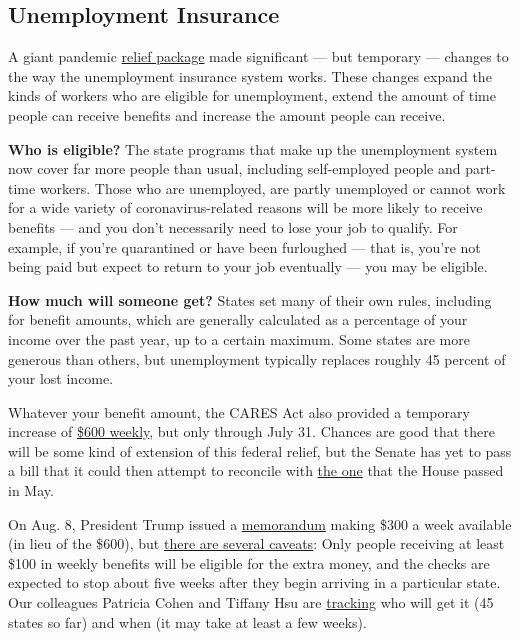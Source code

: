 \hypertarget{unemployment-insurance}{%
\subsection{Unemployment Insurance}\label{unemployment-insurance}}

A giant pandemic
\href{https://www.nytimes3xbfgragh.onion/2020/03/27/world/coronavirus-live-news-updates.html\#link-1900f91a}{relief
package} made significant --- but temporary --- changes to the way the
unemployment insurance system works. These changes expand the kinds of
workers who are eligible for unemployment, extend the amount of time
people can receive benefits and increase the amount people can receive.

\textbf{Who is eligible?} The state programs that make up the
unemployment system now cover far more people than usual, including
self-employed people and part-time workers. Those who are unemployed,
are partly unemployed or cannot work for a wide variety of
coronavirus-related reasons will be more likely to receive benefits ---
and you don't necessarily need to lose your job to qualify. For example,
if you're quarantined or have been furloughed --- that is, you're not
being paid but expect to return to your job eventually --- you may be
eligible.

\textbf{How much will someone get?} States set many of their own rules,
including for benefit amounts, which are generally calculated as a
percentage of your income over the past year, up to a certain maximum.
Some states are more generous than others, but unemployment typically
replaces roughly 45 percent of your lost income.

Whatever your benefit amount, the CARES Act also provided a temporary
increase of
\href{https://www.nytimes3xbfgragh.onion/interactive/2020/04/23/business/economy/unemployment-benefits-stimulus-coronavirus.html}{\$600
weekly}, but only through July 31. Chances are good that there will be
some kind of extension of this federal relief, but the Senate has yet to
pass a bill that it could then attempt to reconcile with
\href{https://www.nytimes3xbfgragh.onion/2020/05/15/us/politics/house-simulus-vote.html}{the
one} that the House passed in May.

On Aug. 8, President Trump issued a
\href{https://www.whitehouse.gov/presidential-actions/memorandum-authorizing-needs-assistance-program-major-disaster-declarations-related-coronavirus-disease-2019/}{memorandum}
making \$300 a week available (in lieu of the \$600), but
\href{https://www.nytimes3xbfgragh.onion/article/stimulus-unemployment-payment-benefi.html}{there
are several caveats}: Only people receiving at least \$100 in weekly
benefits will be eligible for the extra money, and the checks are
expected to stop about five weeks after they begin arriving in a
particular state. Our colleagues Patricia Cohen and Tiffany Hsu are
\href{https://www.nytimes3xbfgragh.onion/article/stimulus-unemployment-payment-benefit.html}{tracking}
who will get it (45 states so far) and when (it may take at least a few
weeks).

